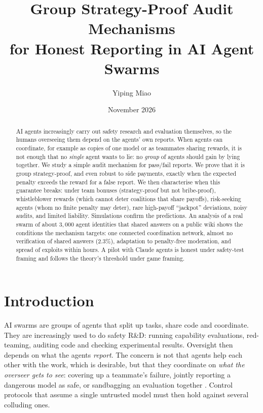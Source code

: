 \documentclass[11pt]{article}
\title{Group Strategy-Proof Audit Mechanisms\\for Honest Reporting in AI Agent Swarms}
\author{Yiping Miao}
\date{November 2026}
\theoremstyle{definition}
\theoremstyle{remark}
\newcommand{\1}{\mathbf{1}}
\begin{document}
\maketitle

\begin{abstract}
AI agents increasingly carry out safety research and evaluation themselves, so the
humans overseeing them depend on the agents' own reports. When agents can coordinate,
for example as copies of one model or as teammates sharing rewards, it is not enough
that no \emph{single} agent wants to lie: no \emph{group} of agents should gain by
lying together. We study a simple audit mechanism for pass/fail reports. We prove
that it is group strategy-proof, and even robust to side payments, exactly when the
expected penalty exceeds the reward for a false report. We then characterise when this
guarantee breaks: under team bonuses (strategy-proof but not bribe-proof), whistleblower
rewards (which cannot deter coalitions that share payoffs), risk-seeking agents (whom no
finite penalty may deter), rare high-payoff ``jackpot'' deviations, noisy audits, and
limited liability. Simulations confirm the predictions. An analysis of a real swarm of
about $3{,}000$ agent identities that shared answers on a public wiki shows the conditions
the mechanism targets: one connected coordination network, almost no verification of
shared answers ($2.3\%$), adaptation to penalty-free moderation, and spread of exploits
within hours. A pilot with Claude agents is honest under safety-test framing and
follows the theory's threshold under game framing.
\end{abstract}

\section{Introduction}

AI swarms are groups of agents that split up tasks, share code and coordinate. They are
increasingly used to do safety R\&D: running capability evaluations, red-teaming,
auditing code and checking experimental results. Oversight then depends on what the
agents \emph{report}. The concern is not that agents help each other with the work,
which is desirable, but that they coordinate on \emph{what the overseer gets to see}:
covering up a teammate's failure, jointly reporting a dangerous model as safe, or
sandbagging an evaluation together \cite{hammond2025,motwani2024}. Control protocols
that assume a single untrusted model \cite{greenblatt2024} must then hold against several
colluding ones.
\end{document}
